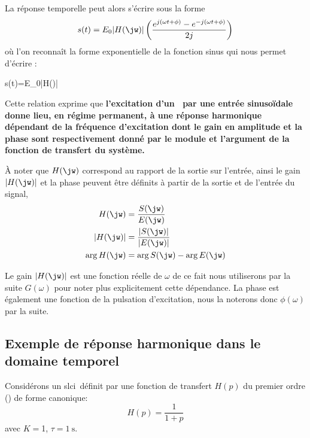 La réponse temporelle peut alors s'écrire sous la forme 
\begin{align*}
s(t)=E_0|H(\jw)|\left(\dfrac{e^{j(\omega t+\phi)}
    -e^{-j(\omega t+\phi)}}{2j}\right)
\end{align*}
où l'on reconnaît la forme exponentielle de la fonction sinus qui nous permet
d'écrire :
\begin{bequation}
    s(t)=E_0|H(\jw)|\label{eq-rh}
\end{bequation}

Cette relation exprime que \textbf{l'excitation d'un {}
~par une entrée sinuso\"idale donne lieu, en régime permanent, à une réponse 
harmonique dépendant de la fréquence d'excitation dont le gain en amplitude et
la phase sont respectivement donné par le module et l'argument de la fonction
de transfert du système.}

\`A noter que $H(\jw)$ correspond au rapport de la sortie sur l'entrée,
ainsi le gain $|H(\jw)|$ et la phase peuvent être définits à partir de la 
sortie et de l'entrée du signal,
\begin{align*}
    H(\jw) &= \dfrac{S(\jw)}{E(\jw)} \\
    |H(\jw)|&= \dfrac{|S(\jw)|}{|E(\jw)|} \\
    \arg{H(\jw)}&=\arg{S(\jw)}-\arg{E(\jw)}
\end{align*}

Le gain $|H(\jw)|$ est une fonction réelle de $\omega$ de ce fait nous 
utiliserons par la suite $G(\omega)$ pour noter plus explicitement cette 
dépendance. La phase est également une fonction de la pulsation d'excitation, 
nous la noterons donc $\phi(\omega)$ par la suite.


\subsection{Exemple de réponse harmonique dans le domaine temporel}

Considérons un \gls{slci}~définit par une fonction de transfert $H(p)$ du 
premier ordre () de forme canonique:
$$
H(p)=\dfrac{1}{1+p}
$$
avec $K=$1, $\tau=\SI{1}{\second}$.

